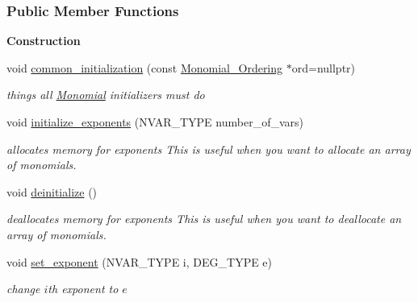 \subsubsection*{Public Member Functions}
\begin{Indent}\textbf{ Construction}\par
\begin{DoxyCompactItemize}
\item 
\mbox{\label{group__polygroup_a7d50554f29ff84177270316088772397}} 
void \hyperlink{group__polygroup_a7d50554f29ff84177270316088772397}{common\+\_\+initialization} (const \hyperlink{group__orderinggroup_class_monomial___ordering}{Monomial\+\_\+\+Ordering} $\ast$ord=nullptr)
\begin{DoxyCompactList}\small\item\em things all {\ttfamily \hyperlink{group__polygroup_class_monomial}{Monomial}} initializers must do \end{DoxyCompactList}\item 
\mbox{\label{group__polygroup_a1103a9a7e8d60147a1e00a1bd23bfea3}} 
void \hyperlink{group__polygroup_a1103a9a7e8d60147a1e00a1bd23bfea3}{initialize\+\_\+exponents} (N\+V\+A\+R\+\_\+\+T\+Y\+PE number\+\_\+of\+\_\+vars)
\begin{DoxyCompactList}\small\item\em allocates memory for exponents This is useful when you want to allocate an array of monomials. \end{DoxyCompactList}\item 
\mbox{\label{group__polygroup_a471eab4cf0ce40225a1b8210513ad9e4}} 
void \hyperlink{group__polygroup_a471eab4cf0ce40225a1b8210513ad9e4}{deinitialize} ()
\begin{DoxyCompactList}\small\item\em deallocates memory for exponents This is useful when you want to deallocate an array of monomials. \end{DoxyCompactList}\item 
\mbox{\label{group__polygroup_a6f28aa6d15979b018003908937155052}} 
void \hyperlink{group__polygroup_a6f28aa6d15979b018003908937155052}{set\+\_\+exponent} (N\+V\+A\+R\+\_\+\+T\+Y\+PE i, D\+E\+G\+\_\+\+T\+Y\+PE e)
\begin{DoxyCompactList}\small\item\em change $i$th exponent to $e$ \end{DoxyCompactList}\item 

\end{DoxyCompactItemize}
\end{Indent}
